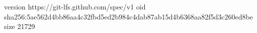 version https://git-lfs.github.com/spec/v1
oid sha256:5ae562d4bb86aa4c32fbd5ed2b984c4dab87ab15d4b6368aa82f5d3c260ed8be
size 21729
